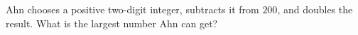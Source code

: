 Ahn chooses a positive two-digit integer, subtracts it from $200$, and doubles the result. What is the largest number Ahn can get?
